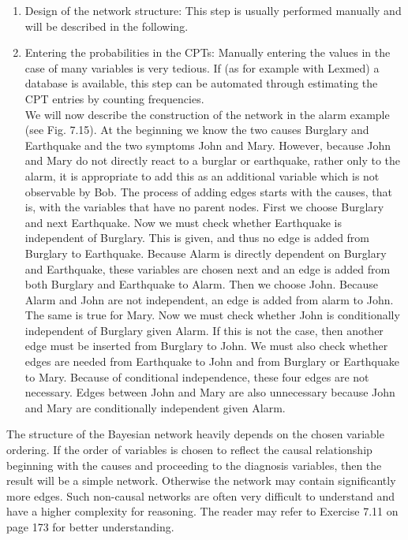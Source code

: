 \documentclass[10pt]{book}
\begin{document}
\begin{enumerate}
  \item Design of the network structure: This step is usually performed manually and will be described in the following.
  \item Entering the probabilities in the CPTs: Manually entering the values in the case of many variables is very tedious. If (as for example with Lexmed) a database is available, this step can be automated through estimating the CPT entries by counting frequencies.\\
We will now describe the construction of the network in the alarm example (see Fig. 7.15). At the beginning we know the two causes Burglary and Earthquake and the two symptoms John and Mary. However, because John and Mary do not directly react to a burglar or earthquake, rather only to the alarm, it is appropriate to add this as an additional variable which is not observable by Bob. The process of adding edges starts with the causes, that is, with the variables that have no parent nodes. First we choose Burglary and next Earthquake. Now we must check whether Earthquake is independent of Burglary. This is given, and thus no edge is added from Burglary to Earthquake. Because Alarm is directly dependent on Burglary and Earthquake, these variables are chosen next and an edge is added from both Burglary and Earthquake to Alarm. Then we choose John. Because Alarm and John are not independent, an edge is added from alarm to John. The same is true for Mary. Now we must check whether John is conditionally independent of Burglary given Alarm. If this is not the case, then another edge must be inserted from Burglary to John. We must also check whether edges are needed from Earthquake to John and from Burglary or Earthquake to Mary. Because of conditional independence, these four edges are not necessary. Edges between John and Mary are also unnecessary because John and Mary are conditionally independent given Alarm.
\end{enumerate}

The structure of the Bayesian network heavily depends on the chosen variable ordering. If the order of variables is chosen to reflect the causal relationship beginning with the causes and proceeding to the diagnosis variables, then the result will be a simple network. Otherwise the network may contain significantly more edges. Such non-causal networks are often very difficult to understand and have a higher complexity for reasoning. The reader may refer to Exercise 7.11 on page 173 for better understanding.
\end{document}
